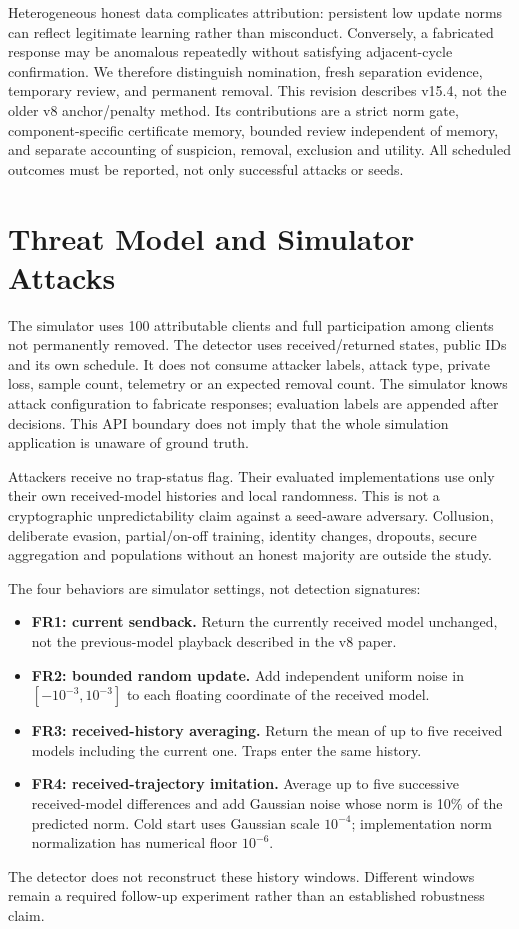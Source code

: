 \documentclass[conference]{IEEEtran}
\begin{document}
Heterogeneous honest data complicates attribution: persistent low update norms
can reflect legitimate learning rather than misconduct. Conversely, a fabricated
response may be anomalous repeatedly without satisfying adjacent-cycle
confirmation. We therefore distinguish nomination, fresh separation evidence,
temporary review, and permanent removal. This revision describes v15.4, not
the older v8 anchor/penalty method. Its contributions are a strict norm gate,
component-specific certificate memory, bounded review independent of memory,
and separate accounting of suspicion, removal, exclusion and utility. All
scheduled outcomes must be reported, not only successful attacks or seeds.

\section{Threat Model and Simulator Attacks}
The simulator uses 100 attributable clients and full participation among clients
not permanently removed. The detector uses received/returned states, public IDs
and its own schedule. It does not consume attacker labels, attack type, private
loss, sample count, telemetry or an expected removal count. The simulator knows
attack configuration to fabricate responses; evaluation labels are appended
after decisions. This API boundary does not imply that the whole simulation
application is unaware of ground truth.

Attackers receive no trap-status flag. Their evaluated implementations use only
their own received-model histories and local randomness. This is not a
cryptographic unpredictability claim against a seed-aware adversary. Collusion,
deliberate evasion, partial/on-off training, identity changes, dropouts, secure
aggregation and populations without an honest majority are outside the study.

The four behaviors are simulator settings, not detection signatures:
\begin{itemize}
\item \textbf{FR1: current sendback.} Return the currently received model unchanged,
not the previous-model playback described in the v8 paper.
\item \textbf{FR2: bounded random update.} Add independent uniform noise in
$[-10^{-3},10^{-3}]$ to each floating coordinate of the received model.
\item \textbf{FR3: received-history averaging.} Return the mean of up to five
received models including the current one. Traps enter the same history.
\item \textbf{FR4: received-trajectory imitation.} Average up to five successive
received-model differences and add Gaussian noise whose norm is 10\% of the
predicted norm. Cold start uses Gaussian scale $10^{-4}$; implementation norm
normalization has numerical floor $10^{-6}$.
\end{itemize}
The detector does not reconstruct these history windows. Different windows
remain a required follow-up experiment rather than an established robustness
claim.
\end{document}
